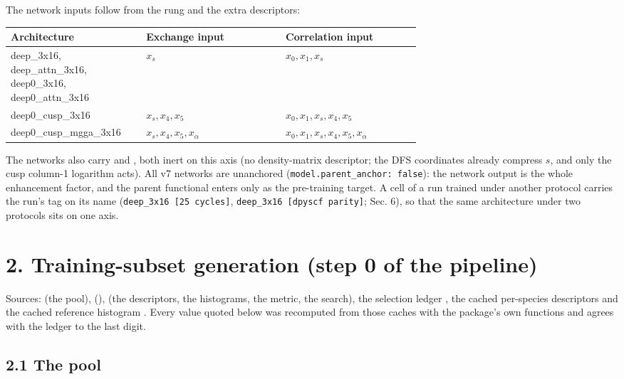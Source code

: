 \documentclass[10pt,a4paper]{article}
\begin{document}
The network inputs follow from the rung and the extra descriptors:

\begin{small}
\begin{longtable}{p{0.334\linewidth}lp{0.334\linewidth}}
\toprule Architecture & Exchange input & Correlation input \\ \midrule \endhead
deep\_3x16, deep\_attn\_3x16, deep0\_3x16, deep0\_attn\_3x16 & $x_s$ & $x_0, x_1, x_s$ \\
deep0\_cusp\_3x16 & $x_s, x_4, x_5$ & $x_0, x_1, x_s, x_4, x_5$ \\
deep0\_cusp\_mgga\_3x16 & $x_s, x_4, x_5, x_\alpha$ & $x_0, x_1, x_s, x_4, x_5, x_\alpha$ \\
\bottomrule \end{longtable}
\end{small}


The  networks also carry  and , both inert on this axis (no density-matrix descriptor; the DFS coordinates already compress $s$, and only the cusp column-1 logarithm acts). All v7 networks are unanchored (\texttt{model.parent\_anchor: false}): the network output is the whole enhancement factor, and the parent functional enters only as the pre-training target. A cell of a run trained under another protocol carries the run's tag on its name (\texttt{deep\_3x16 [25 cycles]}, \texttt{deep\_3x16 [dpyscf parity]}; Sec. 6), so that the same architecture under two protocols sits on one axis.

\section*{2. Training-subset generation (step 0 of the pipeline)}

Sources:  (the pool),  (),  (the descriptors, the histograms, the metric, the search), the selection ledger , the cached per-species descriptors  and the cached reference histogram . Every value quoted below was recomputed from those caches with the package's own functions and agrees with the ledger to the last digit.

\subsection*{2.1 The pool}
\end{document}

